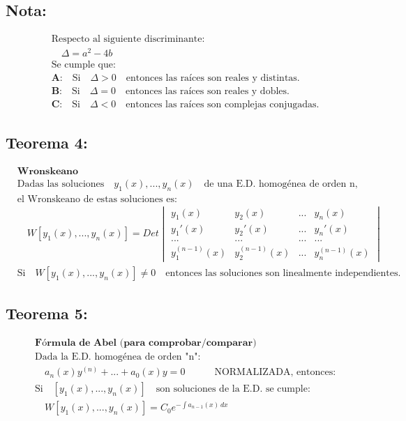 \documentclass[a4paper,12pt,numbers=noenddot]{scrreprt}
\begin{document}
\subsection*{Nota:}
\begin{align*}
    &\text{Respecto al siguiente discriminante:}\\
    &\quad \Delta = a^2 - 4b\\
    &\text{Se cumple que:}\\
    &\textbf{A:} \quad \text{Si} \quad \Delta > 0 \quad \text{entonces las raíces son reales y distintas.}\\
    &\textbf{B:} \quad \text{Si} \quad \Delta = 0 \quad \text{entonces las raíces son reales y dobles.}\\
    &\textbf{C:} \quad \text{Si} \quad \Delta < 0 \quad \text{entonces las raíces son complejas conjugadas.}
\end{align*}

\subsection*{Teorema 4:}
\begin{align*}
    &\textbf{Wronskeano}\\
    &\text{Dadas las soluciones} \quad y_1(x),...,y_n(x) \quad \text{de una E.D. homogénea de orden n,}\\
    &\text{el Wronskeano de estas soluciones es:}\\
    &\quad W{[y_1(x),...,y_n(x)]} = Det \begin{vmatrix}
        y_1(x) & y_2(x) & ... & y_n(x)\\
        y_1'(x) & y_2'(x) & ... & y_n'(x)\\
        ... & ... & ... & ...\\
        y_1^{(n-1)}(x) & y_2^{(n-1)}(x) & ... & y_n^{(n-1)}(x)
    \end{vmatrix}\\
    &\text{Si} \quad W{[y_1(x),...,y_n(x)]} \not = 0 \quad \text{entonces las soluciones son linealmente independientes.}
\end{align*}

\subsection*{Teorema 5:}
\begin{align*}
    &\textbf{Fórmula de Abel (para comprobar/comparar)}\\
    &\text{Dada la E.D. homogénea de orden "n":}\\
    &\quad a_n(x)y^{(n)}+...+a_0(x)y = 0 \quad \quad \quad \text{NORMALIZADA, entonces:}\\
    &\text{Si} \quad {[y_ 1(x), ..., y_n(x)]} \quad \text{son soluciones de la E.D. se cumple:}\\
    &\quad {W[y_1(x),...,y_n(x)]} = C_0 e^{-\int a_{n-1}(x)\,dx}
\end{align*}
\end{document}
